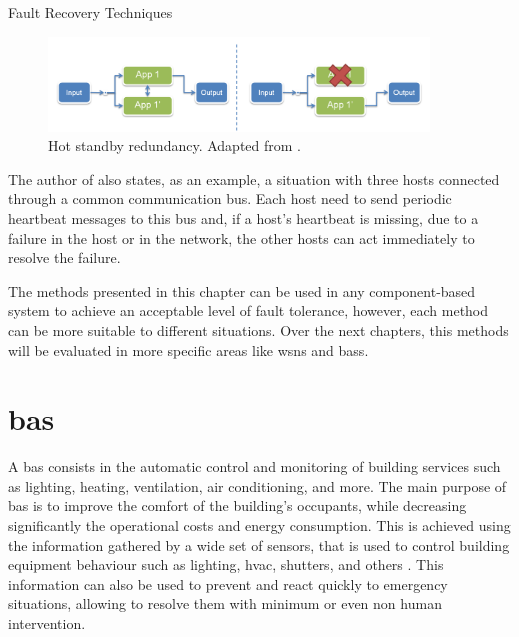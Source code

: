 \begin{Paragraph}{Fault Recovery Techniques}
	\begin{figure}[H]
		\centering
		\includegraphics[width=0.9\textwidth]{figures/hotstandby.png}
		\caption{Hot standby redundancy. Adapted from \cite{Schweiz}.}
		\label{fig:hot_standby}
	\end{figure}

The author of \cite{Schweiz} also states, as an example, a situation with three hosts connected through a common communication bus. Each host need to send periodic heartbeat messages to this bus and, if a host's heartbeat is missing, due to a failure in the host or in the network, the other hosts can act immediately to resolve the failure.
	
\end{Paragraph}

The methods presented in this chapter can be used in any component-based system to achieve an acceptable level of fault tolerance, however, each method can be more suitable to different situations. Over the next chapters, this methods will be evaluated in more specific areas like \acf{wsn}s and \acf{bas}s. 

\section{\acf{bas}}

A \acf{bas} consists in the automatic control and monitoring of building services such as lighting, heating, ventilation, air conditioning, and more. The main purpose of \ac{bas} is to improve the comfort of the building's occupants, while decreasing significantly the operational costs and energy consumption. This is achieved using the information gathered by a wide set of sensors, that is used to control building equipment behaviour such as lighting, \ac{hvac}, shutters, and others \cite{Brambley2005}. This information can also be used to prevent and react quickly to emergency situations, allowing to resolve them with minimum or even non human intervention.

